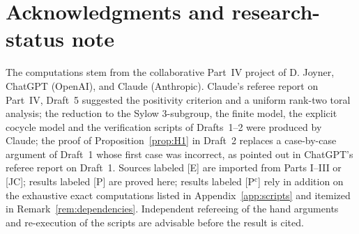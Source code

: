\documentclass[11pt]{article}
\theoremstyle{plain}
\theoremstyle{definition}
\begin{document}
\section*{Acknowledgments and research-status note}
The computations stem from the collaborative Part~IV project of
D. Joyner, ChatGPT (OpenAI), and Claude (Anthropic).  Claude's
referee report on Part~IV, Draft~5 suggested the positivity
criterion and a uniform rank-two toral analysis; the reduction to the
Sylow $3$-subgroup, the finite model, the explicit cocycle model and
the verification scripts of Drafts~1--2 were produced by Claude;
the proof of Proposition~\ref{prop:H1} in Draft~2 replaces a
case-by-case argument of Draft~1 whose first case was incorrect, as
pointed out in ChatGPT's referee report on Draft~1.  Sources
labeled [E] are imported from Parts I--III or [JC]; results labeled
[P] are proved here; results labeled [P$^{\mathrm c}$] rely in addition
on the exhaustive exact computations listed in Appendix~\ref{app:scripts}
and itemized in Remark~\ref{rem:dependencies}.  Independent refereeing of the hand arguments and
re-execution of the scripts are advisable before the result is cited.
\end{document}
